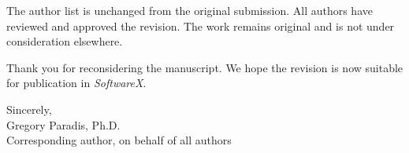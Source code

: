 \documentclass[10pt]{article}
\begin{document}
The author list is unchanged from the original submission. All authors have reviewed and approved the revision. The work remains original and is not under consideration elsewhere.

Thank you for reconsidering the manuscript. We hope the revision is now suitable for publication in \textit{SoftwareX}.

Sincerely,\\[1.5em]
Gregory Paradis, Ph.D.\\
Corresponding author, on behalf of all authors
\end{document}
